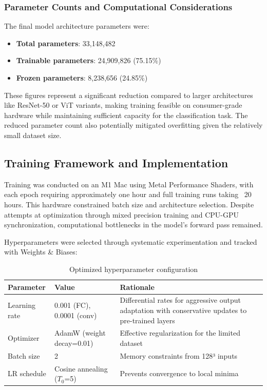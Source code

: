 \documentclass[12pt, a4paper]{article}
\begin{document}
\subsubsection{Parameter Counts and Computational Considerations}

The final model architecture parameters were:

\begin{itemize}
    \item \textbf{Total parameters}: 33,148,482
    \item \textbf{Trainable parameters}: 24,909,826 (75.15\%)
    \item \textbf{Frozen parameters}: 8,238,656 (24.85\%)
\end{itemize}

These figures represent a significant reduction compared to larger architectures like ResNet-50 or ViT variants, making training feasible on consumer-grade hardware while maintaining sufficient capacity for the classification task. The reduced parameter count also potentially mitigated overfitting given the relatively small dataset size.

\subsection{Training Framework and Implementation}

Training was conducted on an M1 Mac using Metal Performance Shaders, with each epoch requiring approximately one hour and full training runs taking ~20 hours. This hardware constrained batch size and architecture selection. Despite attempts at optimization through mixed precision training and CPU-GPU synchronization, computational bottlenecks in the model's forward pass remained.

Hyperparameters were selected through systematic experimentation and tracked with Weights \& Biases:

\begin{table}[htbp]
\centering
\begin{tabular}{|l|l|p{5.5cm}|}
\hline
\textbf{Parameter} & \textbf{Value} & \textbf{Rationale} \\
\hline
Learning rate & 0.001 (FC), 0.0001 (conv) & Differential rates for aggressive output adaptation with conservative updates to pre-trained layers \\
\hline
Optimizer & AdamW (weight decay=0.01) & Effective regularization for the limited dataset \\
\hline
Batch size & 2 & Memory constraints from 128³ inputs \\
\hline
LR schedule & Cosine annealing ($T_0$=5) & Prevents convergence to local minima \\
\hline
\end{tabular}
\caption{Optimized hyperparameter configuration}
\end{table}
\end{document}
